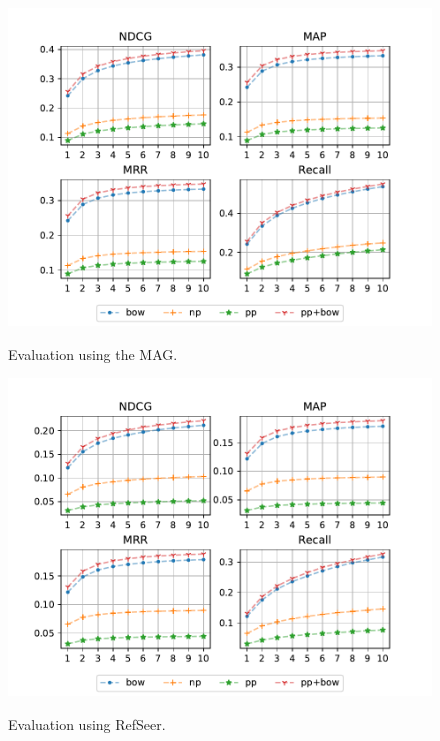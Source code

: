 \begin{figure}
  \centering
    \includegraphics[width=.9\textwidth]{figures/evaluation/MAG_CS_es_wAbs_3M.pdf}
  \label{fig:evalmag}
  \caption{Evaluation using the MAG.}
\end{figure}

\begin{figure}
  \centering
    \includegraphics[width=.9\textwidth]{figures/evaluation/RefSeer.pdf}
  \label{fig:evalrefseer}
  \caption{Evaluation using RefSeer.}
\end{figure}

